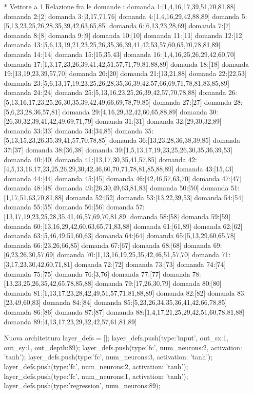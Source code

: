* Vettore a 1
Relazione fra le domande :
domanda 1:[1,4,16,17,39,51,70,81,88]
domanda 2:[2]
domanda 3:[3,17,71,76]
domanda 4:[1,4,16,29,42,88,89]
domanda 5:[5,13,23,25,26,28,35,39,42,63,65,85]
domanda 6:[6,13,23,28,69]
domanda 7:[7]
domanda 8:[8]
domanda 9:[9]
domanda 10:[10]
domanda 11:[11]
domanda 12:[12]
domanda 13:[5,6,13,19,21,23,25,26,35,36,39,41,42,53,57,60,65,70,78,81,89]
domanda 14:[14]
domanda 15:[15,35,43]
domanda 16:[1,4,16,25,26,29,42,60,70]
domanda 17:[1,3,17,23,26,39,41,42,51,57,71,79,81,88,89]
domanda 18:[18]
domanda 19:[13,19,23,39,57,70]
domanda 20:[20]
domanda 21:[13,21,88]
domanda 22:[22,53]
domanda 23:[5,6,13,17,19,23,25,26,28,35,36,39,42,57,66,69,71,78,81,83,85,89]
domanda 24:[24]
domanda 25:[5,13,16,23,25,26,39,42,57,70,78,88]
domanda 26:[5,13,16,17,23,25,26,30,35,39,42,49,66,69,78,79,85]
domanda 27:[27]
domanda 28:[5,6,23,28,36,57,81]
domanda 29:[4,16,29,32,42,60,65,88,89]
domanda 30:[26,30,32,39,41,42,49,69,71,79]
domanda 31:[31]
domanda 32:[29,30,32,89]
domanda 33:[33]
domanda 34:[34,85]
domanda 35:[5,13,15,23,26,35,39,41,57,70,78,85]
domanda 36:[13,23,28,36,38,39,85]
domanda 37:[37]
domanda 38:[36,38]
domanda 39:[1,5,13,17,19,23,25,26,30,35,36,39,53]
domanda 40:[40]
domanda 41:[13,17,30,35,41,57,85]
domanda 42:[4,5,13,16,17,23,25,26,29,30,42,46,60,70,71,78,81,85,88,89]
domanda 43:[15,43]
domanda 44:[44]
domanda 45:[45]
domanda 46:[42,46,57,63,70]
domanda 47:[47]
domanda 48:[48]
domanda 49:[26,30,49,63,81,83]
domanda 50:[50]
domanda 51:[1,17,51,63,70,81,88]
domanda 52:[52]
domanda 53:[13,22,39,53]
domanda 54:[54]
domanda 55:[55]
domanda 56:[56]
domanda 57:[13,17,19,23,25,28,35,41,46,57,69,70,81,89]
domanda 58:[58]
domanda 59:[59]
domanda 60:[13,16,29,42,60,63,65,71,83,88]
domanda 61:[61,89]
domanda 62:[62]
domanda 63:[5,46,49,51,60,63]
domanda 64:[64]
domanda 65:[5,13,29,60,65,78]
domanda 66:[23,26,66,85]
domanda 67:[67]
domanda 68:[68]
domanda 69:[6,23,26,30,57,69]
domanda 70:[1,13,16,19,25,35,42,46,51,57,70]
domanda 71:[3,17,23,30,42,60,71,81]
domanda 72:[72]
domanda 73:[73]
domanda 74:[74]
domanda 75:[75]
domanda 76:[3,76]
domanda 77:[77]
domanda 78:[13,23,25,26,35,42,65,78,85,88]
domanda 79:[17,26,30,79]
domanda 80:[80]
domanda 81:[1,13,17,23,28,42,49,51,57,71,81,88,89]
domanda 82:[82]
domanda 83:[23,49,60,83]
domanda 84:[84]
domanda 85:[5,23,26,34,35,36,41,42,66,78,85]
domanda 86:[86]
domanda 87:[87]
domanda 88:[1,4,17,21,25,29,42,51,60,78,81,88]
domanda 89:[4,13,17,23,29,32,42,57,61,81,89]


Nuova architettura
layer_defs = [];
layer_defs.push({type:'input', out_sx:1, out_sy:1, out_depth:89});
layer_defs.push({type:'fc', num_neurons:2, activation: 'tanh'});
layer_defs.push({type:'fc', num_neurons:3, activation: 'tanh'});
layer_defs.push({type:'fc', num_neurons:2, activation: 'tanh'});
layer_defs.push({type:'fc', num_neurons:1, activation: 'tanh'});
layer_defs.push({type:'regression', num_neurons:89});

